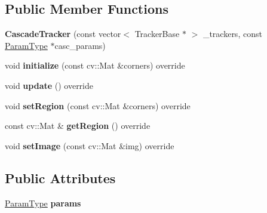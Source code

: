 \subsection*{Public Member Functions}
\begin{DoxyCompactItemize}
\item 
\hypertarget{classCascadeTracker_a18cdecc9ee0c781d72bbeda73038a348}{{\bfseries Cascade\-Tracker} (const vector$<$ Tracker\-Base $\ast$ $>$ \-\_\-trackers, const \hyperlink{structCascadeParams}{Param\-Type} $\ast$casc\-\_\-params)}\label{classCascadeTracker_a18cdecc9ee0c781d72bbeda73038a348}

\item 
\hypertarget{classCascadeTracker_ad6b9d0a494f3d2ff5709c6aa8f904b6b}{void {\bfseries initialize} (const cv\-::\-Mat \&corners) override}\label{classCascadeTracker_ad6b9d0a494f3d2ff5709c6aa8f904b6b}

\item 
\hypertarget{classCascadeTracker_afd3628c013327ebc70d6d63610cb26aa}{void {\bfseries update} () override}\label{classCascadeTracker_afd3628c013327ebc70d6d63610cb26aa}

\item 
\hypertarget{classCascadeTracker_a2c9d50442cadaa46f1632b4b8ea63fd2}{void {\bfseries set\-Region} (const cv\-::\-Mat \&corners) override}\label{classCascadeTracker_a2c9d50442cadaa46f1632b4b8ea63fd2}

\item 
\hypertarget{classCascadeTracker_a1b84edf12ac0bd425730c066883fa16a}{const cv\-::\-Mat \& {\bfseries get\-Region} () override}\label{classCascadeTracker_a1b84edf12ac0bd425730c066883fa16a}

\item 
\hypertarget{classCascadeTracker_a2e6a421c69864b8c565f324ab2a8aeb5}{void {\bfseries set\-Image} (const cv\-::\-Mat \&img) override}\label{classCascadeTracker_a2e6a421c69864b8c565f324ab2a8aeb5}

\end{DoxyCompactItemize}
\subsection*{Public Attributes}
\begin{DoxyCompactItemize}
\item 
\hypertarget{classCascadeTracker_a7e96165cef1fe1341a185c80dde82979}{\hyperlink{structCascadeParams}{Param\-Type} {\bfseries params}}\label{classCascadeTracker_a7e96165cef1fe1341a185c80dde82979}

\end{DoxyCompactItemize}
